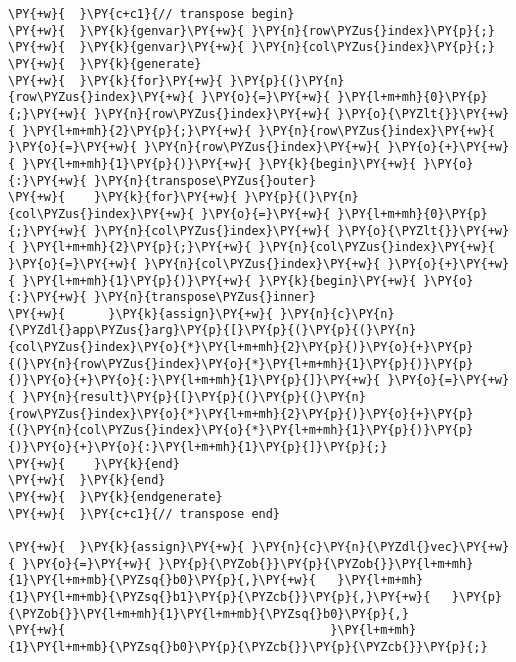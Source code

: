 {\begin{Verbatim}[commandchars=\\\{\}]
\PY{+w}{  }\PY{c+c1}{// transpose begin}
\PY{+w}{  }\PY{k}{genvar}\PY{+w}{ }\PY{n}{row\PYZus{}index}\PY{p}{;}
\PY{+w}{  }\PY{k}{genvar}\PY{+w}{ }\PY{n}{col\PYZus{}index}\PY{p}{;}
\PY{+w}{  }\PY{k}{generate}
\PY{+w}{  }\PY{k}{for}\PY{+w}{ }\PY{p}{(}\PY{n}{row\PYZus{}index}\PY{+w}{ }\PY{o}{=}\PY{+w}{ }\PY{l+m+mh}{0}\PY{p}{;}\PY{+w}{ }\PY{n}{row\PYZus{}index}\PY{+w}{ }\PY{o}{\PYZlt{}}\PY{+w}{ }\PY{l+m+mh}{2}\PY{p}{;}\PY{+w}{ }\PY{n}{row\PYZus{}index}\PY{+w}{ }\PY{o}{=}\PY{+w}{ }\PY{n}{row\PYZus{}index}\PY{+w}{ }\PY{o}{+}\PY{+w}{ }\PY{l+m+mh}{1}\PY{p}{)}\PY{+w}{ }\PY{k}{begin}\PY{+w}{ }\PY{o}{:}\PY{+w}{ }\PY{n}{transpose\PYZus{}outer}
\PY{+w}{    }\PY{k}{for}\PY{+w}{ }\PY{p}{(}\PY{n}{col\PYZus{}index}\PY{+w}{ }\PY{o}{=}\PY{+w}{ }\PY{l+m+mh}{0}\PY{p}{;}\PY{+w}{ }\PY{n}{col\PYZus{}index}\PY{+w}{ }\PY{o}{\PYZlt{}}\PY{+w}{ }\PY{l+m+mh}{2}\PY{p}{;}\PY{+w}{ }\PY{n}{col\PYZus{}index}\PY{+w}{ }\PY{o}{=}\PY{+w}{ }\PY{n}{col\PYZus{}index}\PY{+w}{ }\PY{o}{+}\PY{+w}{ }\PY{l+m+mh}{1}\PY{p}{)}\PY{+w}{ }\PY{k}{begin}\PY{+w}{ }\PY{o}{:}\PY{+w}{ }\PY{n}{transpose\PYZus{}inner}
\PY{+w}{      }\PY{k}{assign}\PY{+w}{ }\PY{n}{c}\PY{n}{\PYZdl{}app\PYZus{}arg}\PY{p}{[}\PY{p}{(}\PY{p}{(}\PY{n}{col\PYZus{}index}\PY{o}{*}\PY{l+m+mh}{2}\PY{p}{)}\PY{o}{+}\PY{p}{(}\PY{n}{row\PYZus{}index}\PY{o}{*}\PY{l+m+mh}{1}\PY{p}{)}\PY{p}{)}\PY{o}{+}\PY{o}{:}\PY{l+m+mh}{1}\PY{p}{]}\PY{+w}{ }\PY{o}{=}\PY{+w}{ }\PY{n}{result}\PY{p}{[}\PY{p}{(}\PY{p}{(}\PY{n}{row\PYZus{}index}\PY{o}{*}\PY{l+m+mh}{2}\PY{p}{)}\PY{o}{+}\PY{p}{(}\PY{n}{col\PYZus{}index}\PY{o}{*}\PY{l+m+mh}{1}\PY{p}{)}\PY{p}{)}\PY{o}{+}\PY{o}{:}\PY{l+m+mh}{1}\PY{p}{]}\PY{p}{;}
\PY{+w}{    }\PY{k}{end}
\PY{+w}{  }\PY{k}{end}
\PY{+w}{  }\PY{k}{endgenerate}
\PY{+w}{  }\PY{c+c1}{// transpose end}

\PY{+w}{  }\PY{k}{assign}\PY{+w}{ }\PY{n}{c}\PY{n}{\PYZdl{}vec}\PY{+w}{ }\PY{o}{=}\PY{+w}{ }\PY{p}{\PYZob{}}\PY{p}{\PYZob{}}\PY{l+m+mh}{1}\PY{l+m+mb}{\PYZsq{}b0}\PY{p}{,}\PY{+w}{   }\PY{l+m+mh}{1}\PY{l+m+mb}{\PYZsq{}b1}\PY{p}{\PYZcb{}}\PY{p}{,}\PY{+w}{   }\PY{p}{\PYZob{}}\PY{l+m+mh}{1}\PY{l+m+mb}{\PYZsq{}b0}\PY{p}{,}
\PY{+w}{                                     }\PY{l+m+mh}{1}\PY{l+m+mb}{\PYZsq{}b0}\PY{p}{\PYZcb{}}\PY{p}{\PYZcb{}}\PY{p}{;}


\end{Verbatim}}
